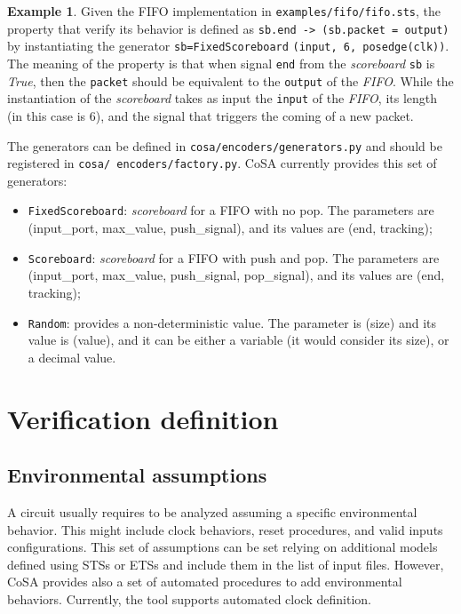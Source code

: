 \documentclass{article}
\theoremstyle{definition}
\newtheorem{example}{Example}[section]
\begin{document}
\begin{example}
  Given the FIFO implementation in \texttt{examples/fifo/fifo.sts},
  the property that verify its behavior is defined as \texttt{sb.end
    -> (sb.packet = output)} by instantiating the generator
  \texttt{sb=FixedScoreboard} \texttt{(input, 6, posedge(clk))}. The meaning of
  the property is that when signal \texttt{end} from the
  \emph{scoreboard} \texttt{sb} is \emph{True}, then the
  \texttt{packet} should be equivalent to the \texttt{output} of the
  \emph{FIFO}. While the instantiation of the \emph{scoreboard} takes
  as input the \texttt{input} of the \emph{FIFO}, its length (in this
  case is 6), and the signal that triggers the coming of a new packet.
\end{example}

The generators can be defined in \texttt{cosa/encoders/generators.py}
and should be registered in \texttt{cosa/
  encoders/factory.py}. CoSA
currently provides this set of generators:

\begin{itemize}
\item \texttt{FixedScoreboard}: \emph{scoreboard} for a FIFO with no
  pop. The parameters are (input\_port, max\_value, push\_signal), and
  its values are (end, tracking);
\item \texttt{Scoreboard}: \emph{scoreboard} for a FIFO with push and
  pop. The parameters are (input\_port, max\_value, push\_signal,
  pop\_signal), and its values are (end, tracking);
\item \texttt{Random}: provides a non-deterministic value. The
  parameter is (size) and its value is (value), and it can be either a
  variable (it would consider its size), or a decimal value.
\end{itemize}  

\section{Verification definition}
\label{sec:problem_definition}


\subsection{Environmental assumptions}

A circuit usually requires to be analyzed assuming a specific
environmental behavior. This might include clock behaviors, reset
procedures, and valid inputs configurations. This set of assumptions
can be set relying on additional models defined using STSs or ETSs and
include them in the list of input files. However, CoSA provides also a
set of automated procedures to add environmental behaviors. Currently,
the tool supports automated clock definition.
\end{document}
